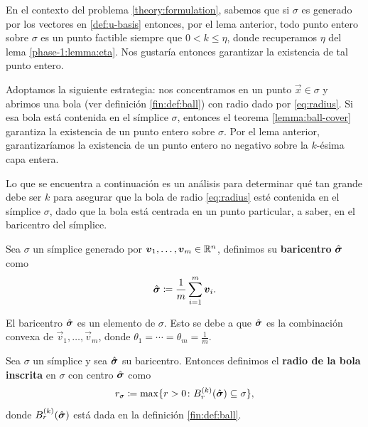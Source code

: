 En el contexto del problema \eqref{theory:formulation}, sabemos que si $\sigma$ es generado por los
vectores en \eqref{def:u-basis} entonces, por el lema anterior, todo punto entero sobre $\sigma$ es
un punto factible siempre que $0 < k \leq \eta$, donde recuperamos $\eta$ del lema
\ref{phase-1:lemma:eta}. Nos gustaría entonces garantizar la existencia de tal punto entero.

Adoptamos la siguiente estrategia: nos concentramos en un punto $\vec{x} \in \sigma$ y abrimos una
bola (ver definición \ref{fin:def:ball}) con radio dado por \eqref{eq:radius}. Si esa bola está
contenida en el símplice $\sigma$, entonces el teorema \ref{lemma:ball-cover} garantiza la
existencia de un punto entero sobre $\sigma$. Por el lema anterior, garantizaríamos la
existencia de un punto entero no negativo sobre la $k$-ésima capa entera.

Lo que se encuentra a continuación es un análisis para determinar qué tan grande debe ser $k$ para
asegurar que la bola de radio \eqref{eq:radius} esté contenida en el símplice $\sigma$, dado que la
bola está centrada en un punto particular, a saber, en el baricentro del símplice.

\begin{definition}
	\label{def:barycenter}
	Sea $\sigma$ un símplice generado por $\boldsymbol{v}_1, \ldots, \boldsymbol{v}_m \in \mathbb{R}^n$, definimos su
	\textbf{baricentro} $\hat{\boldsymbol{ \sigma }}$ como
	\begin{equation*}
		\hat{\boldsymbol{ \sigma }} \coloneq \frac{1}{m} \sum_{i=1}^{m}\boldsymbol{v}_i.
	\end{equation*}
\end{definition}
\begin{observation}
	El baricentro $\hat{\boldsymbol{ \sigma }}$ es un elemento de $\sigma$. Esto se debe a que $\hat{\boldsymbol{ \sigma }}$ es la
	combinación convexa de $\vec{v}_1, \ldots, \vec{v}_m$, donde $\theta_1 = \cdots = \theta_m =
	\frac{1}{m}$.
\end{observation}

\begin{definition}
	\label{def:r-sigma}
	Sea $\sigma$ un símplice y sea $\hat{\boldsymbol{ \sigma }}$ su baricentro. Entonces definimos el \textbf{radio
	de la bola inscrita} en $\sigma$ con centro $\hat{\boldsymbol{ \sigma }}$ como
	\begin{equation}
		\label{eq:def:r-sigma}
		r_\sigma \coloneq \max \lbrace r > 0 \colon B_r^{(k)}(\hat{\boldsymbol{ \sigma }})
		\subseteq \sigma \rbrace,
	\end{equation}
	donde $B_r^{(k)}(\hat{\boldsymbol{ \sigma }})$ está dada en la definición \ref{fin:def:ball}.
\end{definition}


